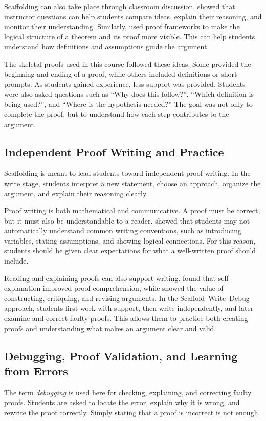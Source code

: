 \documentclass[12pt]{article}
\begin{document}
Scaffolding can also take place through classroom discussion. \textcite{blanton2003} showed that instructor questions can help students compare ideas, explain their reasoning, and monitor their understanding. Similarly, \textcite{selden2018} used proof frameworks to make the logical structure of a theorem and its proof more visible. This can help students understand how definitions and assumptions guide the argument.

The skeletal proofs used in this course followed these ideas. Some provided the beginning and ending of a proof, while others included definitions or short prompts. As students gained experience, less support was provided. Students were also asked questions such as \enquote{Why does this follow?}, \enquote{Which definition is being used?}, and \enquote{Where is the hypothesis needed?} The goal was not only to complete the proof, but to understand how each step contributes to the argument.

\subsection{Independent Proof Writing and Practice}

Scaffolding is meant to lead students toward independent proof writing. In the write stage, students interpret a new statement, choose an approach, organize the argument, and explain their reasoning clearly.

Proof writing is both mathematical and communicative. A proof must be correct, but it must also be understandable to a reader. \textcite{lew2019} showed that students may not automatically understand common writing conventions, such as introducing variables, stating assumptions, and showing logical connections. For this reason, students should be given clear expectations for what a well-written proof should include.

Reading and explaining proofs can also support writing. \textcite{hodds2014} found that self-explanation improved proof comprehension, while \textcite{yee2018} showed the value of constructing, critiquing, and revising arguments. In the Scaffold--Write--Debug approach, students first work with support, then write independently, and later examine and correct faulty proofs. This allows them to practice both creating proofs and understanding what makes an argument clear and valid.

\subsection{Debugging, Proof Validation, and Learning from Errors}
The term \emph{debugging} is used here for checking, explaining, and correcting faulty proofs. Students are asked to locate the error, explain why it is wrong, and rewrite the proof correctly. Simply stating that a proof is incorrect is not enough.
\end{document}
